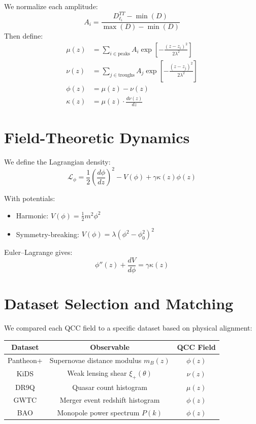 \documentclass[12pt]{article}
\begin{document}
	We normalize each amplitude:
	\begin{equation}
		A_i = \frac{D_{\ell_i}^{TT} - \min(D)}{\max(D) - \min(D)}
	\end{equation}
	Then define:
	\begin{align}
		\mu(z) &= \sum_{i \in \text{peaks}} A_i \exp\left[-\frac{(z - z_i)^2}{2\lambda^2}\right] \\
		\nu(z) &= \sum_{j \in \text{troughs}} A_j \exp\left[-\frac{(z - z_j)^2}{2\lambda^2}\right] \\
		\phi(z) &= \mu(z) - \nu(z) \\
		\kappa(z) &= \mu(z) \cdot \frac{d\nu(z)}{dz}
	\end{align}
	
	\section{Field-Theoretic Dynamics}
	We define the Lagrangian density:
	\begin{equation}
		\mathcal{L}_\phi = \frac{1}{2}\left(\frac{d\phi}{dz}\right)^2 - V(\phi) + \gamma \kappa(z) \phi(z)
	\end{equation}
	
	With potentials:
	\begin{itemize}
		\item Harmonic: \( V(\phi) = \frac{1}{2} m^2 \phi^2 \)
		\item Symmetry-breaking: \( V(\phi) = \lambda(\phi^2 - \phi_0^2)^2 \)
	\end{itemize}
	
	Euler--Lagrange gives:
	\begin{equation}
		\phi''(z) + \frac{dV}{d\phi} = \gamma \kappa(z)
	\end{equation}
	
	\section{Dataset Selection and Matching}
	We compared each QCC field to a specific dataset based on physical alignment:
	
	\begin{center}
		\begin{tabular}{|c|c|c|}
			\hline
			Dataset & Observable & QCC Field \\
			\hline
			Pantheon+ & Supernovae distance modulus \( m_B(z) \) & \( \phi(z) \) \\
			KiDS & Weak lensing shear \( \xi_+(\theta) \) & \( \nu(z) \) \\
			DR9Q & Quasar count histogram & \( \mu(z) \) \\
			GWTC & Merger event redshift histogram & \( \phi(z) \) \\
			BAO & Monopole power spectrum \( P(k) \) & \( \phi(z) \) \\
			\hline
		\end{tabular}
	\end{center}
	
\end{document}
